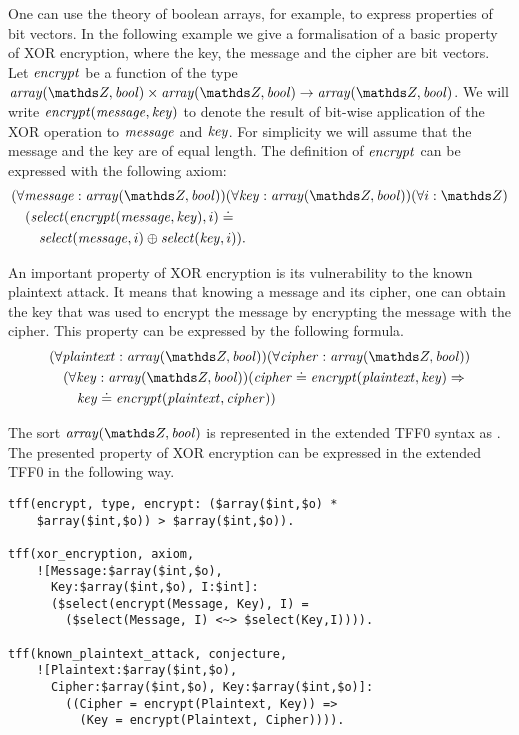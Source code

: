 One can use the theory of boolean arrays, for example, to express properties of bit vectors. In the following example we give a formalisation of a basic property of XOR encryption, where the key, the message and the cipher are bit vectors. Let $\mathit{encrypt}$ be a function of the type $\arrayt(\Z,\bool) \times \arrayt(\Z,\bool) \to \arrayt(\Z,\bool)$. We will write $\mathit{encrypt}(\mathit{message}, \mathit{key})$ to denote the result of bit-wise application of the XOR operation to $\mathit{message}$ and $\mathit{key}$. For simplicity we will assume that the message and the key are of equal length. The definition of $\mathit{encrypt}$ can be expressed with the following axiom:
\begin{align*}
  &(\forall \msg:\arrayt(\Z,\bool))(\forall \key:\arrayt(\Z,\bool))(\forall i:\Z)\\
  &\quad(\select{\encrypt(\msg,\key)}{i} \eql \\
  &\quad\quad\select{\msg}{i} \oplus \select{\key}{i}).
\end{align*}

An important property of XOR encryption is its vulnerability to the known plaintext attack. It means that knowing a message and its cipher, one can obtain the key that was used to encrypt the message by encrypting the message with the cipher. This property can be expressed by the following formula.
\begin{align*}
  &(\forall \plaintext:\arrayt(\Z,\bool))(\forall \cipher:\arrayt(\Z,\bool))\\
  &\quad(\forall \key:\arrayt(\Z,\bool))(\cipher \eql \encrypt(\plaintext,\key) \implies\\
  &\quad\quad\key \eql \encrypt(\plaintext,\cipher))
\end{align*}

The sort $\arrayt(\Z,\bool)$ is represented in the extended TFF0 syntax as \darray{\dint}{\dbool}. The presented property of XOR encryption can be expressed in the extended TFF0 in the following way.
\begin{lstlisting}
tff(encrypt, type, encrypt: ($array($int,$o) *
    $array($int,$o)) > $array($int,$o)).

tff(xor_encryption, axiom,
    ![Message:$array($int,$o),
      Key:$array($int,$o), I:$int]:
      ($select(encrypt(Message, Key), I) =
        ($select(Message, I) <~> $select(Key,I)))).

tff(known_plaintext_attack, conjecture,
    ![Plaintext:$array($int,$o),
      Cipher:$array($int,$o), Key:$array($int,$o)]:
        ((Cipher = encrypt(Plaintext, Key)) =>
          (Key = encrypt(Plaintext, Cipher)))).
\end{lstlisting}
